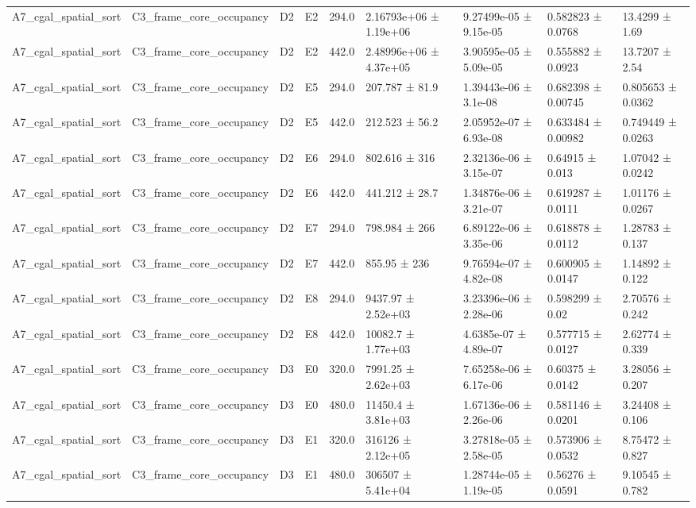 \begin{table}
\begin{tabular}{lllllllll}
A7\_cgal\_spatial\_sort & C3\_frame\_core\_occupancy & D2 & E2 & 294.0 & 2.16793e+06 ± 1.19e+06 & 9.27499e-05 ± 9.15e-05 & 0.582823 ± 0.0768 & 13.4299 ± 1.69 \\
A7\_cgal\_spatial\_sort & C3\_frame\_core\_occupancy & D2 & E2 & 442.0 & 2.48996e+06 ± 4.37e+05 & 3.90595e-05 ± 5.09e-05 & 0.555882 ± 0.0923 & 13.7207 ± 2.54 \\
A7\_cgal\_spatial\_sort & C3\_frame\_core\_occupancy & D2 & E5 & 294.0 & 207.787 ± 81.9 & 1.39443e-06 ± 3.1e-08 & 0.682398 ± 0.00745 & 0.805653 ± 0.0362 \\
A7\_cgal\_spatial\_sort & C3\_frame\_core\_occupancy & D2 & E5 & 442.0 & 212.523 ± 56.2 & 2.05952e-07 ± 6.93e-08 & 0.633484 ± 0.00982 & 0.749449 ± 0.0263 \\
A7\_cgal\_spatial\_sort & C3\_frame\_core\_occupancy & D2 & E6 & 294.0 & 802.616 ± 316 & 2.32136e-06 ± 3.15e-07 & 0.64915 ± 0.013 & 1.07042 ± 0.0242 \\
A7\_cgal\_spatial\_sort & C3\_frame\_core\_occupancy & D2 & E6 & 442.0 & 441.212 ± 28.7 & 1.34876e-06 ± 3.21e-07 & 0.619287 ± 0.0111 & 1.01176 ± 0.0267 \\
A7\_cgal\_spatial\_sort & C3\_frame\_core\_occupancy & D2 & E7 & 294.0 & 798.984 ± 266 & 6.89122e-06 ± 3.35e-06 & 0.618878 ± 0.0112 & 1.28783 ± 0.137 \\
A7\_cgal\_spatial\_sort & C3\_frame\_core\_occupancy & D2 & E7 & 442.0 & 855.95 ± 236 & 9.76594e-07 ± 4.82e-08 & 0.600905 ± 0.0147 & 1.14892 ± 0.122 \\
A7\_cgal\_spatial\_sort & C3\_frame\_core\_occupancy & D2 & E8 & 294.0 & 9437.97 ± 2.52e+03 & 3.23396e-06 ± 2.28e-06 & 0.598299 ± 0.02 & 2.70576 ± 0.242 \\
A7\_cgal\_spatial\_sort & C3\_frame\_core\_occupancy & D2 & E8 & 442.0 & 10082.7 ± 1.77e+03 & 4.6385e-07 ± 4.89e-07 & 0.577715 ± 0.0127 & 2.62774 ± 0.339 \\
A7\_cgal\_spatial\_sort & C3\_frame\_core\_occupancy & D3 & E0 & 320.0 & 7991.25 ± 2.62e+03 & 7.65258e-06 ± 6.17e-06 & 0.60375 ± 0.0142 & 3.28056 ± 0.207 \\
A7\_cgal\_spatial\_sort & C3\_frame\_core\_occupancy & D3 & E0 & 480.0 & 11450.4 ± 3.81e+03 & 1.67136e-06 ± 2.26e-06 & 0.581146 ± 0.0201 & 3.24408 ± 0.106 \\
A7\_cgal\_spatial\_sort & C3\_frame\_core\_occupancy & D3 & E1 & 320.0 & 316126 ± 2.12e+05 & 3.27818e-05 ± 2.58e-05 & 0.573906 ± 0.0532 & 8.75472 ± 0.827 \\
A7\_cgal\_spatial\_sort & C3\_frame\_core\_occupancy & D3 & E1 & 480.0 & 306507 ± 5.41e+04 & 1.28744e-05 ± 1.19e-05 & 0.56276 ± 0.0591 & 9.10545 ± 0.782 \\

\end{tabular}
\end{table}
